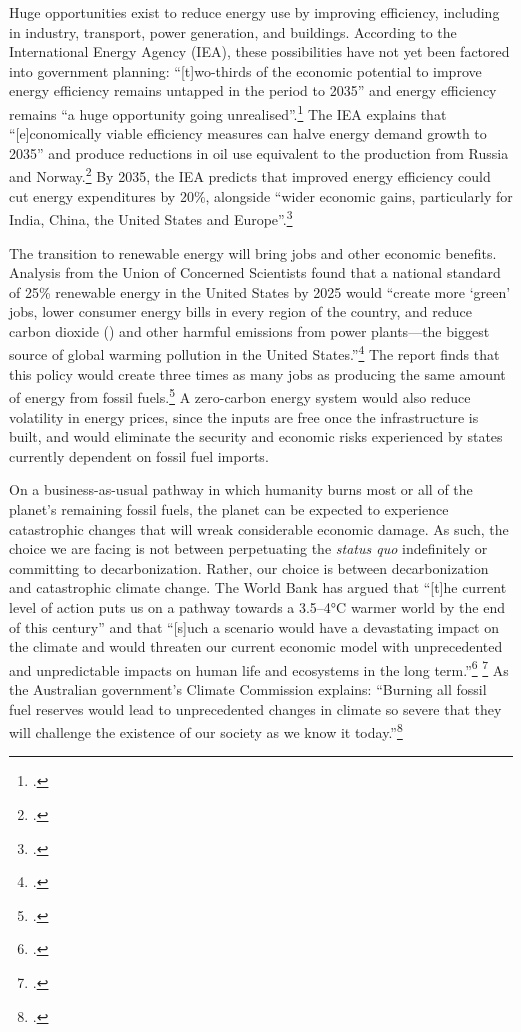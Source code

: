 Huge opportunities exist to reduce energy use by improving efficiency, including in industry, transport, power generation, and buildings.
According to the International Energy Agency (IEA), these possibilities have not yet been factored into government planning: ``[t]wo-thirds of the economic potential to improve energy efficiency remains untapped in the period to 2035'' and energy efficiency remains ``a huge opportunity going unrealised''.\footcite[][p. 13]{IEA2012press}
The IEA explains that ``[e]conomically viable efficiency measures can halve energy demand growth to 2035'' and produce reductions in oil use equivalent to the production from Russia and Norway.\footcite[][p. 14]{IEA2012press}
By 2035, the IEA predicts that improved energy efficiency could cut energy expenditures by 20\%, alongside ``wider economic gains, particularly for India, China, the United States and Europe''.\footcite[][p. 15]{IEA2012press}



The transition to renewable energy will bring jobs and other economic benefits.
Analysis from the Union of Concerned Scientists found that a national standard of 25\% renewable energy in the United States by 2025 would ``create more `green' jobs, lower consumer energy bills in every region of the country, and reduce carbon dioxide () and other harmful emissions from power plants—the biggest source of global warming pollution in the United States.''\footcite[][]{ConcernedScientistsJobs}
The report finds that this policy would create three times as many jobs as producing the same amount of energy from fossil fuels.\footcite[See also: ][]{CSBenefitsRenewable}
A zero-carbon energy system would also reduce volatility in energy prices, since the inputs are free once the infrastructure is built, and would eliminate the security and economic risks experienced by states currently dependent on fossil fuel imports.



On a business-as-usual pathway in which humanity burns most or all of the planet's remaining fossil fuels, the planet can be expected to experience catastrophic changes that will wreak considerable economic damage.
As such, the choice we are facing is not between perpetuating the \emph{status quo} indefinitely or committing to decarbonization.
Rather, our choice is between decarbonization and catastrophic climate change.
The World Bank has argued that ``[t]he current level of action puts us on a pathway towards a 3.5–4°C warmer world by the end of this century'' and that ``[s]uch a scenario would have a devastating impact on the climate and would threaten our current economic model with unprecedented and unpredictable impacts on human life and ecosystems in the long term.''\footcite[][p. 13]{WorldBankCarbonPricing} \footcite[See also:][]{WoesReverse}
As the Australian government's Climate Commission explains: ``Burning all fossil fuel reserves would lead to unprecedented changes in climate so severe that they will challenge the existence of our society as we know it today.''\footcite[][p. 5]{CriticalDecade2013}


